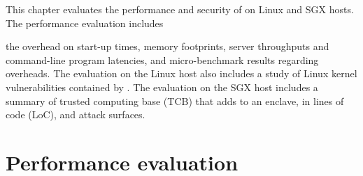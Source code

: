 This chapter evaluates the performance and security of  \graphene{} on Linux and SGX hosts.
The performance evaluation includes


 the overhead on start-up times, memory footprints, server throughputs and command-line program latencies, and micro-benchmark results regarding \linuxapi{} overheads.
The evaluation on the Linux host also includes a study of Linux kernel vulnerabilities contained by \graphene{}.
The evaluation on the SGX host includes a summary of trusted computing base (TCB) that \graphenesgx{} adds to an enclave, in lines of code (LoC), and attack surfaces.











\section{Performance evaluation}
\label{sec:eval:perf}





